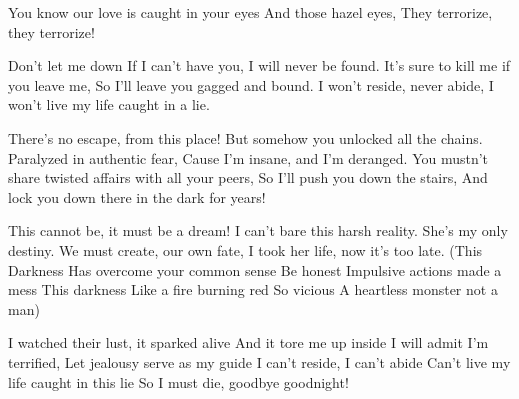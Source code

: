\beginchorus
You know our love is caught in your eyes
And those hazel eyes,  \brk  They terrorize, they terrorize!
\endchorus

\beginverse
Don't let me down
If I can't have you, I will never be found.
It's sure to kill me if you leave me,
So I'll leave you gagged and bound.
I won't reside, never abide,
I won't live my life caught in a lie.
\endverse

\beginchorus
There's no escape, from this place!
But somehow you unlocked all the chains.
Paralyzed in authentic fear,
Cause I'm insane, and I'm deranged.
You mustn't share twisted affairs with all your peers,
So I'll push you down the stairs,
And lock you down there in the dark for years!
\endchorus

\beginverse
[Outro]
This cannot be, it must be a dream!
I can't bare this harsh reality.
She's my only destiny.
We must create, our own fate,
I took her life, now it's too late.
(This Darkness
Has overcome your common sense
Be honest
Impulsive actions made a mess
This darkness
Like a fire burning red
So vicious
A heartless monster not a man)
\endverse

\beginchorus
I watched their lust, it sparked alive
And it tore me up inside
I will admit I'm terrified,
Let jealousy serve as my guide
I can't reside, I can't abide
Can't live my life caught in this lie
So I must die, goodbye goodnight!
\endchorus


\endsong
